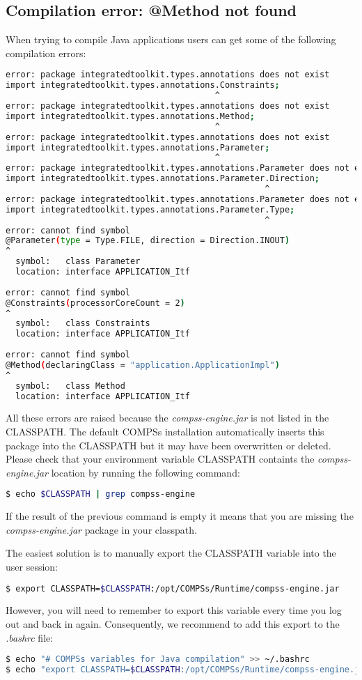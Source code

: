 \subsection{Compilation error: @Method not found}
When trying to compile Java applications users can get some of the following compilation errors:
\begin{lstlisting}[language=bash]
error: package integratedtoolkit.types.annotations does not exist
import integratedtoolkit.types.annotations.Constraints;
                                          ^
error: package integratedtoolkit.types.annotations does not exist
import integratedtoolkit.types.annotations.Method;
                                          ^
error: package integratedtoolkit.types.annotations does not exist
import integratedtoolkit.types.annotations.Parameter;
                                          ^
error: package integratedtoolkit.types.annotations.Parameter does not exist
import integratedtoolkit.types.annotations.Parameter.Direction;
                                                    ^
error: package integratedtoolkit.types.annotations.Parameter does not exist
import integratedtoolkit.types.annotations.Parameter.Type;
                                                    ^
error: cannot find symbol
@Parameter(type = Type.FILE, direction = Direction.INOUT)
^
  symbol:   class Parameter
  location: interface APPLICATION_Itf
  
error: cannot find symbol
@Constraints(processorCoreCount = 2)
^
  symbol:   class Constraints
  location: interface APPLICATION_Itf
  
error: cannot find symbol
@Method(declaringClass = "application.ApplicationImpl")
^
  symbol:   class Method
  location: interface APPLICATION_Itf
\end{lstlisting}

All these errors are raised because the \textit{compss-engine.jar} is not listed in the CLASSPATH. The default COMPSs installation
automatically inserts this package into the CLASSPATH but it may have been overwritten or deleted. Please check that your 
environment variable CLASSPATH containts the \textit{compss-engine.jar} location by running the following command:
\begin{lstlisting}[language=bash]
$ echo $CLASSPATH | grep compss-engine
\end{lstlisting}
If the result of the previous command is empty it means that you are missing the \textit{compss-engine.jar} package in your classpath. 

The easiest solution is to manually export the CLASSPATH variable into the user session:
\begin{lstlisting}[language=bash]
$ export CLASSPATH=$CLASSPATH:/opt/COMPSs/Runtime/compss-engine.jar
\end{lstlisting}
However, you will need to remember to export this variable every time you log out and back in again. Consequently, we recommend to 
add this export to the \textit{.bashrc} file:
\begin{lstlisting}[language=bash]
$ echo "# COMPSs variables for Java compilation" >> ~/.bashrc
$ echo "export CLASSPATH=$CLASSPATH:/opt/COMPSs/Runtime/compss-engine.jar" >> ~/.bashrc
\end{lstlisting}

